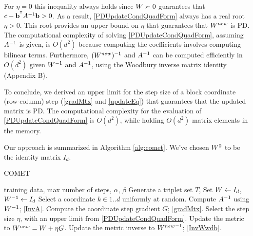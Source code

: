 \documentclass{article}
\begin{document}


For $\eta = 0$ this inequality always
holds since ${W} \succ 0$ guarantees that $c-\mathbf{b}^{{}^\mathsf{T}} A^{-1} \mathbf{b} >0$. As a result,
 \eqref{PDUpdateCondQuadForm} always has a real
root $\eta > 0$. This root provides an upper bound on $\eta$ that guarantees that ${{W^{new}}}$ is PD. The computational complexity of solving \eqref{PDUpdateCondQuadForm}, assuming $A^{-1}$ is given, is $O(d^2)$ because computing the coefficients involves computing bilinear terms.
Furthermore, $({{W^{new}}})^{-1}$ and $A^{-1}$ can be computed efficiently in $O(d^2)$ given ${W}^{-1}$ and $A^{-1}$, using the Woodbury inverse matrix identity (Appendix B).

To conclude, we derived an upper limit for the step size of a block coordinate (row-column) step (\eqref{gradMtx} and \eqref{updateEq}) that guarantees that the updated matrix is PD. The computational complexity for the evaluation
of \eqref{PDUpdateCondQuadForm} is $O(d^2)$, while holding $O(d^2)$ matrix elements in the memory.
Our approach is summarized in Algorithm \ref{alg:comet}. We've chosen ${W}^0$ to be the identity matrix $I_d$.

\begin{algorithm}[tb]
   \caption{COMET}
   \label{alg:comet}
\begin{algorithmic}[1]
    training data, max number of steps, $\alpha$, $\beta$
   \STATE Generate a triplet set $T$, Set  ${W}  \leftarrow I_d$, ${W}^{-1}  \leftarrow I_d$
   \REPEAT 
   \STATE Select a coordinate $k \in {1..d}$ uniformly at random.
   \STATE Compute $A^{-1}$ using ${W}^{-1}$; \eqref{InvA}.
   \STATE Compute the coordinate step gradient $G$; \eqref{gradMtx}.
   \STATE Select the step size $\eta$, with an upper limit from \eqref{PDUpdateCondQuadForm}.
   \STATE Update the metric to ${{W^{new}}}={W}+\eta G$.
   \STATE Update the metric inverse to ${{W^{new}}}^{-1}$; \eqref{InvWwdb}.
\end{algorithmic}
\end{algorithm}
\end{document}
